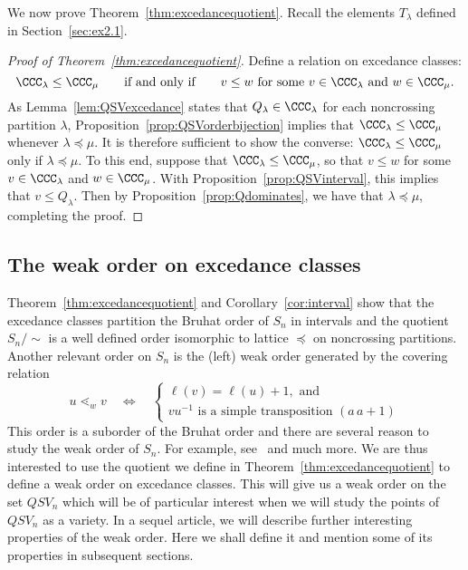 \documentclass[12pt]{amsart}
\theoremstyle{definition}
\theoremstyle{remark}
\numberwithin{equation}{section}
\begin{document}
We now prove Theorem~\ref{thm:excedancequotient}.  Recall the elements $T_{\lambda}$ defined in Section~\ref{sec:ex2.1}.

\begin{proof}[Proof of Theorem~\ref{thm:excedancequotient}]
Define a relation on excedance classes:
\[
\CCC_{\lambda} \le \CCC_{\mu}
\qquad\text{if and only if}\qquad
\text{$v \le w$ for some $v \in \CCC_{\lambda}$ and $w \in \CCC_{\mu}$}.
\]
As Lemma~\ref{lem:QSVexcedance} states that $Q_{\lambda} \in \CCC_{\lambda}$ for each noncrossing partition $\lambda$, Proposition~\ref{prop:QSVorderbijection} implies that $\CCC_{\lambda} \le \CCC_{\mu}$ whenever $\lambda \preceq \mu$.  It is therefore sufficient to show the converse: $\CCC_{\lambda} \le \CCC_{\mu}$ only if $\lambda \preceq \mu$.  To this end, suppose that $\CCC_{\lambda} \le \CCC_{\mu}$, so that $v \le w$ for some $v \in \CCC_{\lambda}$ and $w \in \CCC_{\mu}$.  With Proposition~\ref{prop:QSVinterval}, this implies that $v \le Q_{\lambda}$.  Then by Proposition~\ref{prop:Qdominates}, we have that $\lambda \preceq \mu$, completing the proof.
\end{proof}

\subsection{The weak order on excedance classes}
\label{sec:weakorder}

Theorem~\ref{thm:excedancequotient} and Corollary~\ref{cor:interval} show that the excedance classes partition the Bruhat order of $S_n$ in intervals and the quotient $S_n/\!\!\sim$ is a 
well defined order isomorphic to lattice $\preceq$ on noncrossing partitions. Another relevant order on $S_n$ is the (left) weak order generated by the  covering relation
	$$u\lessdot_w v \quad\iff\quad  \begin{cases} \ell(v)=\ell(u)+1, \text{ and } \\ vu^{-1} \text{ is a simple transposition } (a\, a+1) \end{cases}$$
This order is a suborder of the Bruhat order and there are several reason to study the weak order of $S_n$. For example, see~\cite{A,B,C} and much more. 
We are thus interested to use the quotient we define in Theorem~\ref{thm:excedancequotient} to define a weak order on excedance classes.
This will give us a weak order on the set $QSV_n$ which will be of particular interest when we will study the points of $QSV_n$ as a variety.  
In a sequel article, we will describe further interesting properties of the weak order. Here we shall define it and mention some of its properties in subsequent sections.
\end{document}

